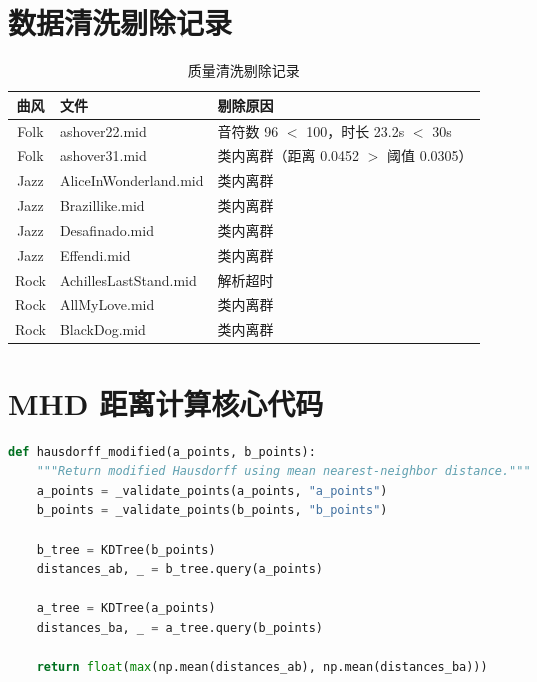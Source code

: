 \documentclass[withoutpreface]{cumcmthesis}
\begin{document}
\begin{appendices}

\section{数据清洗剔除记录}

\begin{table}[htbp]
    \centering
    \caption{质量清洗剔除记录}
    \begin{tabular}{cll}
        \toprule
        \textbf{曲风} & \textbf{文件} & \textbf{剔除原因} \\
        \midrule
        Folk & ashover22.mid & 音符数 96 $<$ 100，时长 23.2s $<$ 30s \\
        Folk & ashover31.mid & 类内离群（距离 0.0452 $>$ 阈值 0.0305） \\
        Jazz & AliceInWonderland.mid & 类内离群 \\
        Jazz & Brazillike.mid & 类内离群 \\
        Jazz & Desafinado.mid & 类内离群 \\
        Jazz & Effendi.mid & 类内离群 \\
        Rock & AchillesLastStand.mid & 解析超时 \\
        Rock & AllMyLove.mid & 类内离群 \\
        Rock & BlackDog.mid & 类内离群 \\
        \bottomrule
    \end{tabular}
\end{table}

\section{MHD 距离计算核心代码}

\begin{lstlisting}[language=python, caption={hausdorff\_modified 核心实现}]
def hausdorff_modified(a_points, b_points):
    """Return modified Hausdorff using mean nearest-neighbor distance."""
    a_points = _validate_points(a_points, "a_points")
    b_points = _validate_points(b_points, "b_points")

    b_tree = KDTree(b_points)
    distances_ab, _ = b_tree.query(a_points)

    a_tree = KDTree(a_points)
    distances_ba, _ = a_tree.query(b_points)

    return float(max(np.mean(distances_ab), np.mean(distances_ba)))
\end{lstlisting}


\end{appendices}
\end{document}
